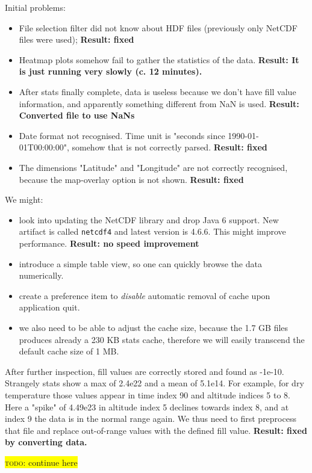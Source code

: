 \documentclass[11pt,a4paper]{article}
\newcommand{\todo}[1]{\colorbox{yellow}{\textsc{todo}: #1}}
\begin{document}
Initial problems:
%
\begin{itemize}
\item File selection filter did not know about HDF files (previously only NetCDF files were used); \textbf{Result: fixed}
\item Heatmap plots somehow fail to gather the statistics of the data. \textbf{Result: It is just running very slowly (c. 12 minutes).}
\item After stats finally complete, data is useless because we don't have fill value information, and apparently something different from NaN is used. \textbf{Result: Converted file to use NaNs}
\item Date format not recognised. Time unit is "seconds since 1990-01-01T00:00:00", somehow that is not correctly parsed. \textbf{Result:  fixed}
\item The dimensions "Latitude" and "Longitude" are not correctly recognised, because the map-overlay option is not shown. \textbf{Result: fixed}
\end{itemize}
%
We might:
%
\begin{itemize}
\item look into updating the NetCDF library and drop Java 6 support. New artifact is called \Verb!netcdf4! and latest version is 4.6.6. This might improve performance. \textbf{Result: no speed improvement}
\item introduce a simple table view, so one can quickly browse the data numerically.
\item create a preference item to \emph{disable} automatic removal of cache upon application quit.
\item we also need to be able to adjust the cache size, because the 1.7 GB files produces already a 230 KB stats cache, therefore we will easily transcend the default cache size of 1 MB.
\end{itemize}
%
After further inspection, fill values are correctly stored and found as -1e-10. Strangely stats show a max of 2.4e22 and a mean of 5.1e14. For example, for dry temperature those values appear in time index 90 and altitude indices 5 to 8. Here a "spike" of 4.49e23 in altitude index 5 declines towards index 8, and at index 9 the data is in the normal range again. We thus need to first preprocess that file and replace out-of-range values with the defined fill value. \textbf{Result: fixed by converting data.}

\todo{continue here}
\end{document}
